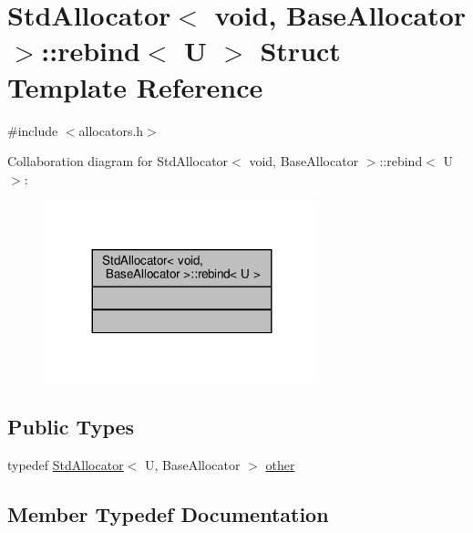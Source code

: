 \hypertarget{structStdAllocator_3_01void_00_01BaseAllocator_01_4_1_1rebind}{}\section{Std\+Allocator$<$ void, Base\+Allocator $>$\+:\+:rebind$<$ U $>$ Struct Template Reference}
\label{structStdAllocator_3_01void_00_01BaseAllocator_01_4_1_1rebind}


{\ttfamily \#include $<$allocators.\+h$>$}



Collaboration diagram for Std\+Allocator$<$ void, Base\+Allocator $>$\+:\+:rebind$<$ U $>$\+:
\nopagebreak
\begin{figure}[H]
\begin{center}
\leavevmode
\includegraphics[width=227pt]{structStdAllocator_3_01void_00_01BaseAllocator_01_4_1_1rebind__coll__graph}
\end{center}
\end{figure}
\subsection*{Public Types}
\begin{DoxyCompactItemize}
\item 
typedef \hyperlink{classStdAllocator}{Std\+Allocator}$<$ U, Base\+Allocator $>$ \hyperlink{structStdAllocator_3_01void_00_01BaseAllocator_01_4_1_1rebind_a05d001c4a784dd30027c19392de10f8e}{other}
\end{DoxyCompactItemize}


\subsection{Member Typedef Documentation}
\mbox{\label{structStdAllocator_3_01void_00_01BaseAllocator_01_4_1_1rebind_a05d001c4a784dd30027c19392de10f8e}} 
